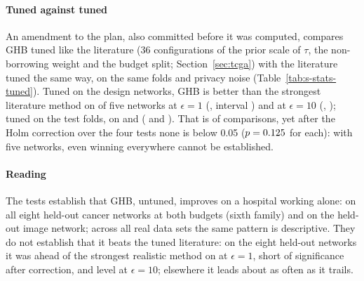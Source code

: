 \documentclass[acmsmall,screen,nonacm]{acmart}
\theoremstyle{acmdefinition}
\begin{document}
\paragraph{Tuned against tuned} An amendment to the plan, also committed before it was computed, compares GHB tuned like the literature (36 configurations of the prior scale of $\tau$, the non-borrowing weight and the budget split; Section~\ref{sec:tcga}) with the literature tuned the same way, on the same folds and privacy noise (Table~\ref{tab:s-stats-tuned}). Tuned on the design networks, GHB is better than the strongest literature method on \SimStTunedOneRealWins{} of five networks at $\epsilon=1$ (\SimStTunedOneRealMean, interval \SimStTunedOneRealCI) and \SimStTunedTenRealWins{} at $\epsilon=10$ (\SimStTunedTenRealMean, \SimStTunedTenRealCI); tuned on the test folds, on \SimStTunedOneOrcWins{} and \SimStTunedTenOrcWins{} (\SimStTunedOneOrcMean{} and \SimStTunedTenOrcMean). That is \SimStTunedWins{} of \SimStTunedPairs{} comparisons, yet after the Holm correction over the four tests none is below 0.05 ($p=0.125$ for each): with five networks, even winning everywhere cannot be established.

\begin{table}[ht]
\centering
\caption{Tuned against tuned on the five held-out TCGA networks: GHB and the literature tuned the same way, on the design networks (realistic) or on each network's test folds (oracle), against the literature method with the lowest mean in that arm. Mean difference in relative log-loss (negative favours GHB) with a 95\% $t$ interval; one-sided exact Wilcoxon signed-rank tests, Holm-adjusted over the four tests.}
\label{tab:s-stats-tuned}
\end{table}

\paragraph{Reading} The tests establish that GHB, untuned, improves on a hospital working alone: on all eight held-out cancer networks at both budgets (sixth family) and on the held-out image network; across all real data sets the same pattern is descriptive. They do not establish that it beats the tuned literature: on the eight held-out networks it was ahead of the strongest realistic method on \SimStHOneRealWins{} at $\epsilon=1$, short of significance after correction, and level at $\epsilon=10$; elsewhere it leads about as often as it trails.
\end{document}

